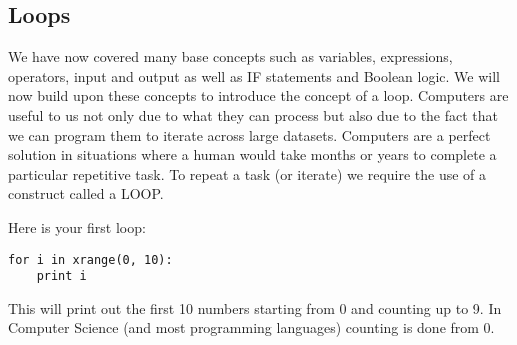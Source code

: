 \documentclass[twocolumn]{article}
\begin{document}
\subsection{Loops}
We have now covered many base concepts such as variables, expressions, operators, input and output as well as IF statements and Boolean logic. We will now build upon these concepts to introduce the concept of a loop. Computers are useful to us not only due to what they can process but also due to the fact that we can program them to iterate across large datasets. Computers are a perfect solution in situations where a human would take months or years to complete a particular repetitive task. To repeat a task (or iterate) we require the use of a construct called a LOOP.

Here is your first loop:
\begin{lstlisting}
for i in xrange(0, 10):
	print i
\end{lstlisting}
This will print out the first 10 numbers starting from 0 and counting up to 9. In Computer Science (and most programming languages) counting is done from 0.
\end{document}
